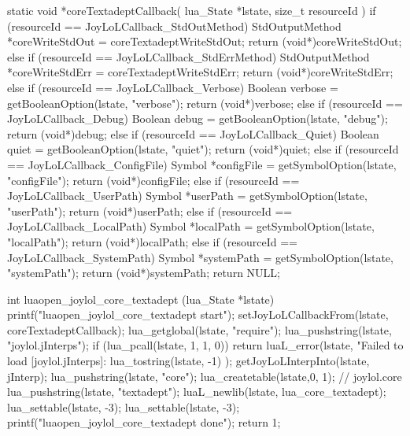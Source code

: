 static void *coreTextadeptCallback(
  lua_State *lstate,
  size_t resourceId
) {
  if (resourceId == JoyLoLCallback_StdOutMethod) {
    StdOutputMethod *coreWriteStdOut =
      coreTextadeptWriteStdOut;
    return (void*)coreWriteStdOut;
  } else if (resourceId == JoyLoLCallback_StdErrMethod) {
    StdOutputMethod *coreWriteStdErr =
      coreTextadeptWriteStdErr;
    return (void*)coreWriteStdErr;
  } else if (resourceId == JoyLoLCallback_Verbose) {
    Boolean verbose = getBooleanOption(lstate, "verbose");
    return (void*)verbose;
  } else if (resourceId == JoyLoLCallback_Debug) {
    Boolean debug = getBooleanOption(lstate, "debug");
    return (void*)debug;
  } else if (resourceId == JoyLoLCallback_Quiet) {
    Boolean quiet = getBooleanOption(lstate, "quiet");
    return (void*)quiet;
  } else if (resourceId == JoyLoLCallback_ConfigFile) {
    Symbol *configFile = getSymbolOption(lstate, "configFile");
    return (void*)configFile;
  } else if (resourceId == JoyLoLCallback_UserPath) {
    Symbol *userPath = getSymbolOption(lstate, "userPath");
    return (void*)userPath;
  } else if (resourceId == JoyLoLCallback_LocalPath) {
    Symbol *localPath = getSymbolOption(lstate, "localPath");
    return (void*)localPath;
  } else if (resourceId == JoyLoLCallback_SystemPath) {
    Symbol *systemPath = getSymbolOption(lstate, "systemPath");
    return (void*)systemPath;
  }
  return NULL;
} 

int luaopen_joylol_core_textadept (lua_State *lstate) {
  printf("luaopen_joylol_core_textadept start\n");
  setJoyLoLCallbackFrom(lstate, coreTextadeptCallback);
  lua_getglobal(lstate, "require");
  lua_pushstring(lstate, "joylol.jInterps");
  if (lua_pcall(lstate, 1, 1, 0)) {
    return luaL_error(lstate,
      "Failed to load [joylol.jInterps]\nERROR:\n%
      lua_tostring(lstate, -1)
    );
  }
  getJoyLoLInterpInto(lstate, jInterp);
  lua_pushstring(lstate, "core");
  lua_createtable(lstate,0, 1); // joylol.core 
  lua_pushstring(lstate, "textadept");
  luaL_newlib(lstate, lua_core_textadept);
  lua_settable(lstate, -3);
  lua_settable(lstate, -3);
  printf("luaopen_joylol_core_textadept done\n");
  return 1;
}
\stopCCode